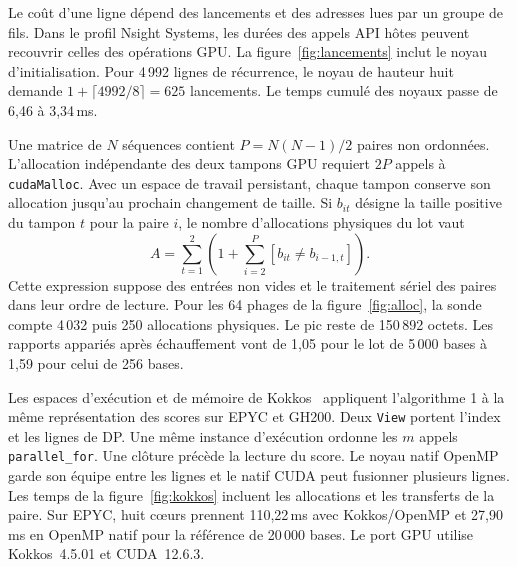 Le coût d'une ligne dépend des lancements et des adresses lues par un groupe de fils. Dans le profil Nsight Systems, les durées des appels API hôtes peuvent recouvrir celles des opérations GPU.
La figure~\ref{fig:lancements} inclut le noyau d'initialisation. Pour 4\,992 lignes de récurrence, le noyau de hauteur huit demande \(1+\lceil4992/8\rceil=625\) lancements. Le temps cumulé des noyaux passe de 6,46 à 3,34\,ms.

Une matrice de \(N\) séquences contient \(P=N(N-1)/2\) paires non ordonnées. L'allocation indépendante des deux tampons GPU requiert \(2P\) appels à \texttt{cudaMalloc}. Avec un espace de travail persistant, chaque tampon conserve son allocation jusqu'au prochain changement de taille. Si \(b_{it}\) désigne la taille positive du tampon \(t\) pour la paire \(i\), le nombre d'allocations physiques du lot vaut
\[
 A=\sum_{t=1}^2\left(1+\sum_{i=2}^{P}[b_{it}\ne b_{i-1,t}]\right).
\]
Cette expression suppose des entrées non vides et le traitement sériel des paires dans leur ordre de lecture.
Pour les 64 phages de la figure~\ref{fig:alloc}, la sonde compte 4\,032 puis 250 allocations physiques. Le pic reste de 150\,892 octets. Les rapports appariés après échauffement vont de 1,05 pour le lot de 5\,000 bases à 1,59 pour celui de 256 bases.


Les espaces d'exécution et de mémoire de Kokkos~\cite{kokkos} appliquent l'algorithme 1 à la même représentation des scores sur EPYC et GH200. Deux \texttt{View} portent l'index et les lignes de DP. Une même instance d'exécution ordonne les \(m\) appels \texttt{parallel\_for}. Une clôture précède la lecture du score. Le noyau natif OpenMP garde son équipe entre les lignes et le natif CUDA peut fusionner plusieurs lignes.
Les temps de la figure~\ref{fig:kokkos} incluent les allocations et les transferts de la paire. Sur EPYC, huit cœurs prennent 110,22\,ms avec Kokkos/OpenMP et 27,90\,ms en OpenMP natif pour la référence de 20\,000 bases. Le port GPU utilise Kokkos~4.5.01 et CUDA~12.6.3.
